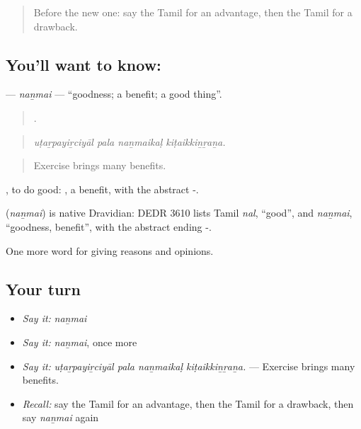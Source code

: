 \label{lesson:TA-C353-nanmai}



\begin{quote}
Before the new one: say the Tamil for an advantage, then the Tamil for a drawback.
\end{quote}

\subsection*{You'll want to know: }
\textbf{} — \emph{naṉmai} — \textquotedblleft{}goodness; a benefit; a good thing\textquotedblright{}.

\begin{quote}
   .
\end{quote}

\begin{quote}
\emph{uṭaṟpayiṟciyāl pala naṉmaikaḷ kiṭaikkiṉṟaṉa.}
\end{quote}

\begin{quote}
Exercise brings many benefits.
\end{quote}

 , to do good: , a benefit, with the abstract -.

\begin{cousinweb}
\textbf{} (\emph{naṉmai}) is native Dravidian: DEDR 3610 lists Tamil \emph{nal}, \textquotedblleft{}good\textquotedblright{}, and \emph{naṉmai}, \textquotedblleft{}goodness, benefit\textquotedblright{}, with the abstract ending -.
\end{cousinweb}

\begin{grammarlens}[title={What you've built}]
One more word for giving reasons and opinions.
\end{grammarlens}

\subsection*{Your turn}
\begin{itemize}
\raggedright
  \item \emph{Say it:} \emph{naṉmai}
  \item \emph{Say it:} \emph{naṉmai}, once more
  \item \emph{Say it:} \emph{uṭaṟpayiṟciyāl pala naṉmaikaḷ kiṭaikkiṉṟaṉa.} — Exercise brings many benefits.
  \item \emph{Recall:} say the Tamil for an advantage, then the Tamil for a drawback, then say \emph{naṉmai} again
\end{itemize}

